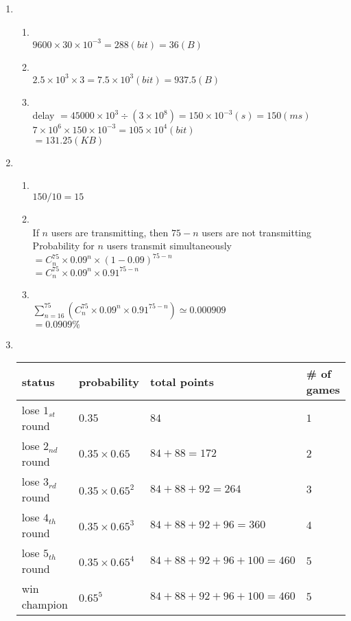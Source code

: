 \documentclass[10pt, a4paper]{article}
\begin{document}
\begin{enumerate}
\item\mbox{}\\
    \begin{enumerate}
    \item\mbox{}\\
        $9600 \times 30 \times 10^{-3} = 288 (bit) = 36 (B)$
    \item\mbox{}\\
        $2.5 \times 10^3 \times 3 = 7.5 \times 10^3 (bit) = 937.5 (B)$
    \item\mbox{}\\
        delay $= 45000 \times 10^3 \div (3 \times 10^8) = 150 \times 10^{-3} (s) = 150 (ms)$\\
        $7 \times 10^6 \times 150 \times 10^{-3} = 105 \times 10^4 (bit)$\\
        $= 131.25 (KB)$
    \end{enumerate}

\item\mbox{}\\
    \begin{enumerate}
    \item\mbox{}\\
        $150 / 10 = 15$
    \item\mbox{}\\
        If $n$ users are transmitting, then $75 - n$ users are not transmitting\\
        Probability for $n$ users transmit simultaneously $= C_{n}^{75} \times 0.09^n \times \left(1 - 0.09\right)^{75-n}$\\
        $= C_{n}^{75} \times 0.09^n \times 0.91^{75-n}$
    \item\mbox{}\\
        $\displaystyle\sum_{n=16}^{75} \left(C_{n}^{75} \times 0.09^n \times 0.91^{75-n}\right) \simeq 0.000909$\\
        $=  0.0909\%$
    \end{enumerate}

\item\mbox{}\\
    \begin{tabular}{llll}
    \toprule
    status & probability & total points & \# of games\\
    \midrule
    lose $1_{st}$ round & $0.35$ & $84$ & $1$\\
    lose $2_{nd}$ round & $0.35 \times 0.65$ & $84 + 88 = 172$ & $2$\\
    lose $3_{rd}$ round & $0.35 \times 0.65^2$ & $84 + 88 + 92 = 264$ & $3$\\
    lose $4_{th}$ round & $0.35 \times 0.65^3$ & $84 + 88 + 92 + 96 = 360$ & $4$\\
    lose $5_{th}$ round & $0.35 \times 0.65^4$ & $84 + 88 + 92 + 96 + 100 = 460$ & $5$\\
    win champion & $0.65^5$ & $84 + 88 + 92 + 96 + 100 = 460$ & $5$\\
    \bottomrule
    \end{tabular}
    \begin{enumerate}


\end{enumerate}
\end{enumerate}
\end{document}
